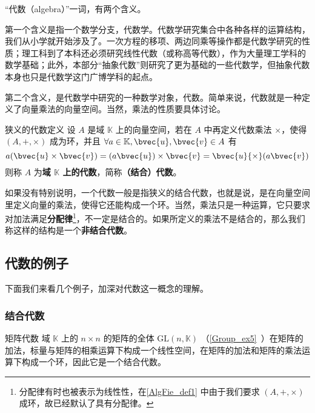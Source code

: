 

“代数（algebra）”一词，有两个含义。

第一个含义是指一个数学分支，代数学。代数学研究集合中各种各样的运算结构，我们从小学就开始涉及了。一次方程的移项、两边同乘等操作都是代数学研究的性质；理工科到了本科还必须研究线性代数（或称高等代数），作为大量理工学科的数学基础；此外，本部分“抽象代数”则研究了更为基础的一些代数学，但抽象代数本身也只是代数学这门广博学科的起点。

第二个含义，是代数学中研究的一种数学对象，代数。简单来说，代数就是一种定义了向量乘法的向量空间。当然，乘法的性质要具体讨论。



\begin{definition}{狭义的代数定义}\label{AlgFie_def1}
设 $A$ 是域 $\mathbb{K}$ 上的向量空间，若在 $A$ 中再定义代数乘法 $\times$，使得 $(A,+,\times)$ 成为环，并且 $\forall a\in \mathbb{K}, \bvec{u}, \bvec{v}\in A$ 有
\begin{equation}
a(\bvec{u} \times \bvec{v})=(a \bvec{u}) \times \bvec{v}=\bvec{u}{\times}(a \bvec{v})
\end{equation}
则称 $A$ 为\textbf{域 $\mathbb{K}$ 上的代数}，简称\textbf{（结合）代数}。

\end{definition}

如果没有特别说明，一个代数一般是指狭义的结合代数，也就是说，是在向量空间里定义向量的乘法，使得它还能构成一个环。当然，乘法只是一种运算，它只要求对加法满足\textbf{分配律}\footnote{分配律有时也被表示为线性性，在\autoref{AlgFie_def1} 中由于我们要求 $(A, +, \times)$ 成环，故已经默认了具有分配律。}，不一定是结合的。如果所定义的乘法不是结合的，那么我们称这样的结构是一个\textbf{非结合代数}。


\subsection{代数的例子}
下面我们来看几个例子，加深对代数这一概念的理解。

\subsubsection{结合代数}

\begin{example}{矩阵代数}
域 $\mathbb{K}$ 上的 $n\times n$ 的矩阵的全体 $\mathrm{GL}(n, \mathbb{K})$ （\autoref{Group_ex5}~）在矩阵的加法，标量与矩阵的相乘运算下构成一个线性空间，在矩阵的加法和矩阵的乘法运算下构成一个环，因此它是一个结合代数。
\end{example}

